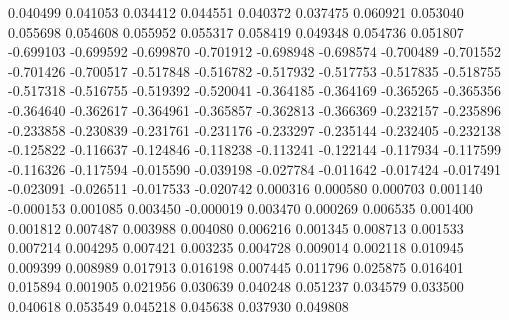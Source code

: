 0.040499
0.041053
0.034412
0.044551
0.040372
0.037475
0.060921
0.053040
0.055698
0.054608
0.055952
0.055317
0.058419
0.049348
0.054736
0.051807
-0.699103
-0.699592
-0.699870
-0.701912
-0.698948
-0.698574
-0.700489
-0.701552
-0.701426
-0.700517
-0.517848
-0.516782
-0.517932
-0.517753
-0.517835
-0.518755
-0.517318
-0.516755
-0.519392
-0.520041
-0.364185
-0.364169
-0.365265
-0.365356
-0.364640
-0.362617
-0.364961
-0.365857
-0.362813
-0.366369
-0.232157
-0.235896
-0.233858
-0.230839
-0.231761
-0.231176
-0.233297
-0.235144
-0.232405
-0.232138
-0.125822
-0.116637
-0.124846
-0.118238
-0.113241
-0.122144
-0.117934
-0.117599
-0.116326
-0.117594
-0.015590
-0.039198
-0.027784
-0.011642
-0.017424
-0.017491
-0.023091
-0.026511
-0.017533
-0.020742
0.000316
0.000580
0.000703
0.001140
-0.000153
0.001085
0.003450
-0.000019
0.003470
0.000269
0.006535
0.001400
0.001812
0.007487
0.003988
0.004080
0.006216
0.001345
0.008713
0.001533
0.007214
0.004295
0.007421
0.003235
0.004728
0.009014
0.002118
0.010945
0.009399
0.008989
0.017913
0.016198
0.007445
0.011796
0.025875
0.016401
0.015894
0.001905
0.021956
0.030639
0.040248
0.051237
0.034579
0.033500
0.040618
0.053549
0.045218
0.045638
0.037930
0.049808
